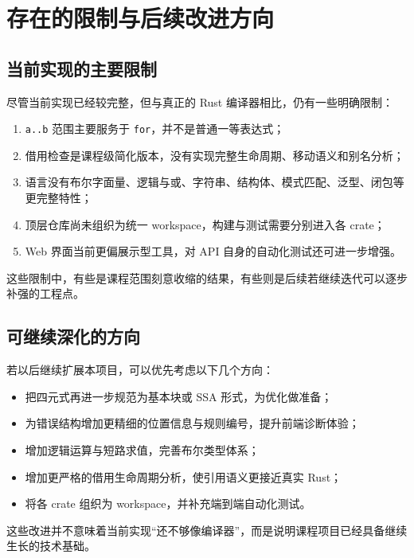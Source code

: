 \documentclass[UTF8,a4paper,12pt]{ctexart}
\newcommand{\pkg}[1]{\texttt{#1}}
\begin{document}
\section{存在的限制与后续改进方向}

\subsection{当前实现的主要限制}

尽管当前实现已经较完整，但与真正的 Rust 编译器相比，仍有一些明确限制：

\begin{enumerate}[label=\arabic*.]
    \item \pkg{a..b} 范围主要服务于 \pkg{for}，并不是普通一等表达式；
    \item 借用检查是课程级简化版本，没有实现完整生命周期、移动语义和别名分析；
    \item 语言没有布尔字面量、逻辑与或、字符串、结构体、模式匹配、泛型、闭包等更完整特性；
    \item 顶层仓库尚未组织为统一 workspace，构建与测试需要分别进入各 crate；
    \item Web 界面当前更偏展示型工具，对 API 自身的自动化测试还可进一步增强。
\end{enumerate}

这些限制中，有些是课程范围刻意收缩的结果，有些则是后续若继续迭代可以逐步补强的工程点。

\subsection{可继续深化的方向}

若以后继续扩展本项目，可以优先考虑以下几个方向：

\begin{itemize}
    \item 把四元式再进一步规范为基本块或 SSA 形式，为优化做准备；
    \item 为错误结构增加更精细的位置信息与规则编号，提升前端诊断体验；
    \item 增加逻辑运算与短路求值，完善布尔类型体系；
    \item 增加更严格的借用生命周期分析，使引用语义更接近真实 Rust；
    \item 将各 crate 组织为 workspace，并补充端到端自动化测试。
\end{itemize}

这些改进并不意味着当前实现“还不够像编译器”，而是说明课程项目已经具备继续生长的技术基础。
\end{document}
